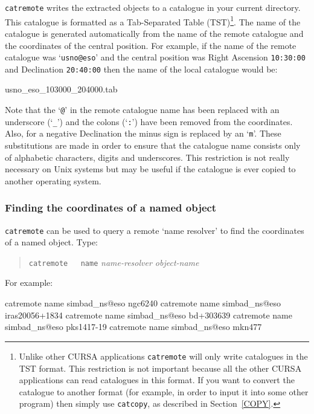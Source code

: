 \documentclass[twoside,11pt]{starlink}
\begin{document}
\texttt{catremote} writes the extracted objects to a catalogue in your
current directory.  This catalogue is formatted as a Tab-Separated Table
(TST)\footnote{Unlike other CURSA applications \texttt{catremote} will only
write catalogues in the TST format.  This restriction is not important
because all the other CURSA applications can read catalogues in this
format.  If you want to convert the catalogue to another format (for
example, in order to input it into some other program) then simply use
\texttt{catcopy}, as described in Section~\ref{COPY}.}.  The name of the
catalogue is generated automatically from the name of the remote
catalogue and the coordinates of the central position.  For example,
if the name of the remote catalogue was `\texttt{usno@eso}' and the central
position was Right Ascension \texttt{10:30:00} and Declination \texttt{20:40:00} then the name of the local catalogue would be:

\begin{terminalv}
usno_eso_103000_204000.tab
\end{terminalv}

Note that the `\texttt{@}' in the remote catalogue name has been replaced
with an underscore (`\texttt{\_}') and the colons (`\texttt{:}') have been
removed from the coordinates.  Also, for a negative Declination the
minus sign is replaced by an `\texttt{m}'.  These substitutions are made
in order to ensure that the catalogue name consists only of alphabetic
characters, digits and underscores.  This restriction is not really
necessary on Unix systems but may be useful if the catalogue is ever
copied to another operating system.

\subsubsection{Finding the coordinates of a named object}

\texttt{catremote} can be used to query a remote `name resolver' to find
the coordinates of a named object.  Type:

\begin{verse}
\texttt{catremote ~ name} \textit{name-resolver object-name}
\end{verse}

For example:

\begin{terminalv}
catremote name simbad_ns@eso ngc6240
catremote name simbad_ns@eso iras20056+1834
catremote name simbad_ns@eso bd+303639
catremote name simbad_ns@eso pks1417-19
catremote name simbad_ns@eso mkn477
\end{terminalv}
\end{document}
